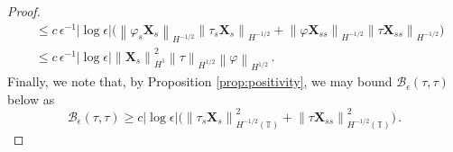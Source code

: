 \documentclass[11pt,reqno]{amsart}
\newcommand{\T}{\mathbb{T}}
\newcommand{\X}{\bm{X}}
\newcommand{\abs}[1]{\left\lvert #1 \right\rvert}
\newcommand{\norm}[1]{\left\lVert #1 \right\rVert}
\newcommand{\mc}[1]{\mathcal{#1}}
\numberwithin{equation}{section}
\theoremstyle{definition}
\begin{document}
\begin{proof}
\begin{equation}
\begin{aligned}
  &\le c\,\epsilon^{-1}\abs{\log\epsilon}\bigg(\norm{\varphi_s\X_s}_{H^{-1/2}}\norm{\tau_s\X_s}_{H^{-1/2}} + \norm{\varphi\X_{ss}}_{H^{-1/2}}\norm{\tau\X_{ss}}_{H^{-1/2}} \bigg) \\
  &\le c\,\epsilon^{-1}\abs{\log\epsilon}\norm{\X_s}_{H^1}^2\norm{\tau}_{H^{1/2}}\norm{\varphi}_{H^{1/2}}\,.
\end{aligned}
\end{equation}
%
%
Finally, we note that, by Proposition \ref{prop:positivity}, we may bound $\mc{B}_\epsilon(\tau,\tau)$ below as 
\begin{equation}\label{eq:Btautau_below}
  \mc{B}_\epsilon(\tau,\tau) 
  \ge c\abs{\log\epsilon}\big(\norm{\tau_s\X_s}_{H^{-1/2}(\T)}^2 + \norm{\tau\X_{ss}}_{H^{-1/2}(\T)}^2\big) \,.
\end{equation}




\end{proof}
\end{document}
